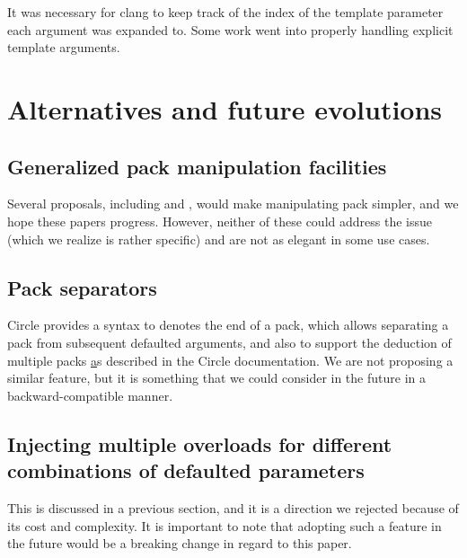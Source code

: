 \documentclass{wg21}
\begin{document}
It was necessary for clang to keep track of the index of the template parameter each argument was expanded to.
Some work went into properly handling explicit template arguments.


\section{Alternatives and future evolutions}

\subsection{Generalized pack manipulation facilities}

Several proposals, including  and , would make manipulating pack simpler,
and we hope these papers progress.
However, neither of these could address the  issue (which we realize is rather specific) and are not as elegant in some use cases.

\subsection{Pack separators}

Circle provides a syntax to denotes the end of a pack, which allows separating a pack from subsequent defaulted arguments,
and also to support the deduction of multiple packs \href{https://github.com/seanbaxter/QDA/blob/master/README.md#parameter-packs} as described in the {Circle documentation}. We are not proposing a similar feature, but it is something that we could consider in the future in a backward-compatible manner.

\subsection{Injecting multiple overloads for different combinations of defaulted parameters}

This is discussed in a previous section, and it is a direction we rejected because of its cost and complexity.
It is important to note that adopting such a feature in the future would be a breaking change in regard to this paper.

%
%
%
\end{document}
